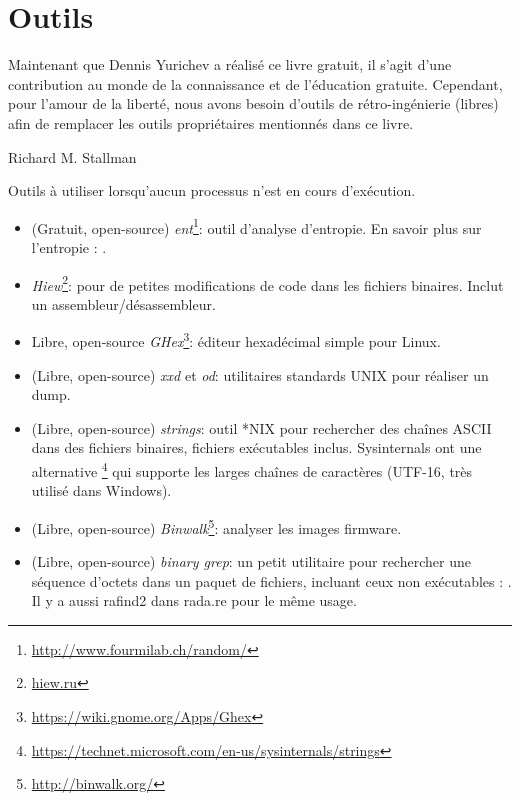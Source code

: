 \chapter{Outils}

\epigraph{Maintenant que Dennis Yurichev a réalisé ce livre gratuit, il s'agit d'une contribution au monde de la connaissance et de l'éducation gratuite.
Cependant, pour l'amour de la liberté, nous avons besoin d'outils de rétro-ingénierie (libres) afin de remplacer les outils propriétaires mentionnés dans ce livre.}{Richard M. Stallman}


Outils à utiliser lorsqu'aucun processus n'est en cours d'exécution.


\begin{itemize}
\item
(Gratuit, open-source) \emph{ent}\footnote{\url{http://www.fourmilab.ch/random/}}: outil d'analyse d'entropie.
En savoir plus sur l'entropie : .

\item
\label{Hiew}
\emph{Hiew}\footnote{\href{http://go.yurichev.com/17035}{hiew.ru}}:
pour de petites modifications de code dans les fichiers binaires.
Inclut un assembleur/désassembleur.

\item {Libre, open-source} \emph{GHex}\footnote{\url{https://wiki.gnome.org/Apps/Ghex}}: éditeur
hexadécimal simple pour Linux.

\item (Libre, open-source) \emph{xxd} et \emph{od}: utilitaires standards UNIX pour réaliser un dump.

\item (Libre, open-source) \emph{strings}: outil *NIX pour rechercher des chaînes ASCII dans des fichiers binaires, fichiers exécutables inclus.
Sysinternals ont une alternative \footnote{\url{https://technet.microsoft.com/en-us/sysinternals/strings}}
qui supporte les larges chaînes de caractères (UTF-16, très utilisé dans Windows).

\item (Libre, open-source) \emph{Binwalk}\footnote{\url{http://binwalk.org/}}: analyser les images firmware.

\item
{}
(Libre, open-source) \emph{binary grep}:
un petit utilitaire pour rechercher une séquence d'octets dans un paquet de fichiers,
incluant ceux non exécutables : \BGREPURL.
Il y a aussi rafind2 dans rada.re pour le même usage.
\end{itemize}

